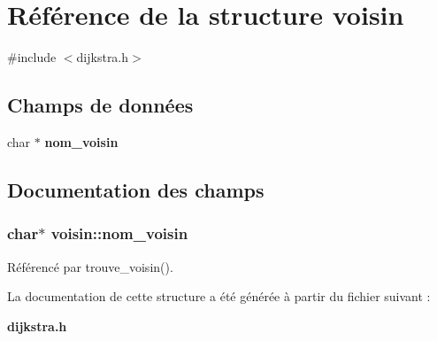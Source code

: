 \section{Référence de la structure voisin}
\label{structvoisin}


{\ttfamily \#include $<$dijkstra.\+h$>$}

\subsection*{Champs de données}
\begin{DoxyCompactItemize}
\item 
char $\ast$ {\bf nom\+\_\+voisin}
\end{DoxyCompactItemize}


\subsection{Documentation des champs}
\subsubsection[{nom\+\_\+voisin}]{\setlength{\rightskip}{0pt plus 5cm}char$\ast$ voisin\+::nom\+\_\+voisin}\label{structvoisin_a1555e66c595e8540ee6794c0760376eb}


Référencé par trouve\+\_\+voisin().



La documentation de cette structure a été générée à partir du fichier suivant \+:\begin{DoxyCompactItemize}
\item 
{\bf dijkstra.\+h}\end{DoxyCompactItemize}
